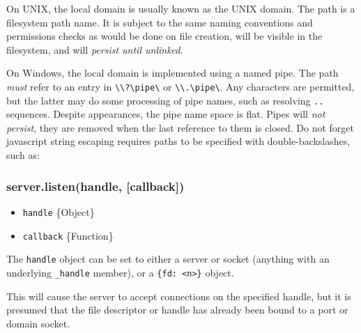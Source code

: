 On UNIX, the local domain is usually known as the UNIX domain. The path
is a filesystem path name. It is subject to the same naming conventions
and permissions checks as would be done on file creation, will be
visible in the filesystem, and will \emph{persist until unlinked}.

On Windows, the local domain is implemented using a named pipe. The path
\emph{must} refer to an entry in
\texttt{\textbackslash{}\textbackslash{}?\textbackslash{}pipe\textbackslash{}}
or
\texttt{\textbackslash{}\textbackslash{}.\textbackslash{}pipe\textbackslash{}}.
Any characters are permitted, but the latter may do some processing of
pipe names, such as resolving \texttt{..} sequences. Despite
appearances, the pipe name space is flat. Pipes will \emph{not persist},
they are removed when the last reference to them is closed. Do not
forget javascript string escaping requires paths to be specified with
double-backslashes, such as:

\begin{Shaded}
\begin{Highlighting}[]
\NormalTok{(}
    \NormalTok{(}\CharTok{\textbackslash{}\textbackslash{}\textbackslash{}\textbackslash{}}\CharTok{\textbackslash{}\textbackslash{}}\NormalTok{, }\NormalTok{(), }\NormalTok{))}
\end{Highlighting}
\end{Shaded}

\subsubsection{server.listen(handle,
{[}callback{]})}\label{server.listenhandle-callback}

\begin{itemize}
\itemsep1pt\parskip0pt
\item
  \texttt{handle} \{Object\}
\item
  \texttt{callback} \{Function\}
\end{itemize}

The \texttt{handle} object can be set to either a server or socket
(anything with an underlying \texttt{\_handle} member), or a
\texttt{\{fd: \textless{}n\textgreater{}\}} object.

This will cause the server to accept connections on the specified
handle, but it is presumed that the file descriptor or handle has
already been bound to a port or domain socket.

